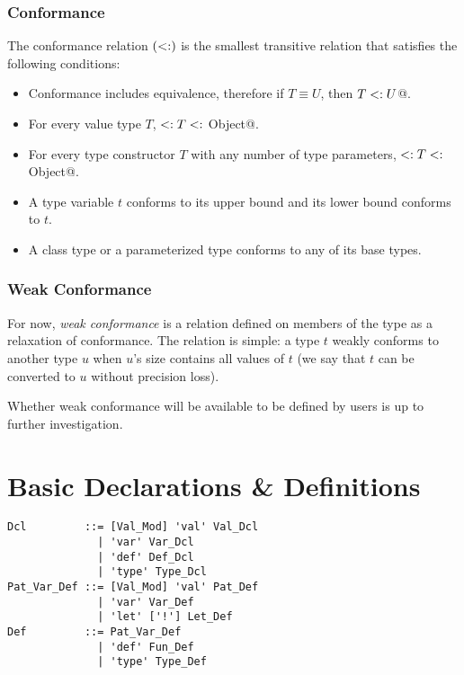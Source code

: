 \subsection{Conformance}
\label{sec:conformance}

The conformance relation $(<:)$ is the smallest transitive relation that satisfies the following conditions:

\begin{itemize}

\item
Conformance includes equivalence, therefore if $T \equiv U$, then \lstinline@$T <: U$@. 

\item
For every value type $T$, \lstinline@Nothing $<: T <:$ Object@. 

\item
For every type constructor $T$ with any number of type parameters, \lstinline@Nothing $<: T <:$ Object@. 

\item
A type variable $t$ conforms to its upper bound and its lower bound conforms to $t$. 

\item
A class type or a parameterized type conforms to any of its base types. 

\end{itemize}

\subsection{Weak Conformance}

For now, {\em weak conformance} is a relation defined on members of the  type as a relaxation of conformance. The relation is simple: a type $t$ weakly conforms to another type $u$ when $u$'s size contains all values of $t$ (we say that $t$ can be converted to $u$ without precision loss). 

Whether weak conformance will be available to be defined by users is up to further investigation. 

\chapter{Basic Declarations \& Definitions}

\syntax\begin{lstlisting}
Dcl         ::= [Val_Mod] 'val' Val_Dcl
              | 'var' Var_Dcl
              | 'def' Def_Dcl
              | 'type' Type_Dcl
Pat_Var_Def ::= [Val_Mod] 'val' Pat_Def
              | 'var' Var_Def
              | 'let' ['!'] Let_Def
Def         ::= Pat_Var_Def
              | 'def' Fun_Def
              | 'type' Type_Def
\end{lstlisting}

